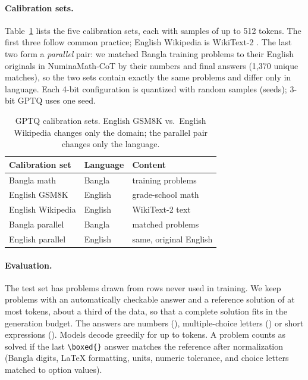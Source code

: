 \documentclass[11pt]{article}
\begin{document}
\paragraph{Calibration sets.}
Table~\ref{tab:calib} lists the five calibration sets, each with \NumCalib{} samples of up to 512 tokens. The first three follow common practice; English Wikipedia is WikiText-2 \citep{merity2017wikitext}. The last two form a \emph{parallel} pair: we matched Bangla training problems to their English originals in NuminaMath-CoT by their numbers and final answers (1,370 unique matches), so the two sets contain exactly the same problems and differ only in language. Each 4-bit configuration is quantized with \NumSeeds{} random samples (seeds); 3-bit GPTQ uses one seed.

\begin{table}[t]
\centering
\small
\begin{tabular}{lll}
\toprule
Calibration set & Language & Content \\
\midrule
Bangla math & Bangla & training problems \\
English GSM8K & English & grade-school math \\
English Wikipedia & English & WikiText-2 text \\
\midrule
Bangla parallel & Bangla & matched problems \\
English parallel & English & same, original English \\
\bottomrule
\end{tabular}
\caption{GPTQ calibration sets. English GSM8K vs.\ English Wikipedia changes only the domain; the parallel pair changes only the language.}
\label{tab:calib}
\end{table}

\paragraph{Evaluation.}
The test set has \NumEval{} problems drawn from rows never used in training. We keep problems with an automatically checkable answer and a reference solution of at most \MaxRefTokens{} tokens, about a third of the data, so that a complete solution fits in the generation budget. The answers are numbers (\CompNumeric), multiple-choice letters (\CompChoice) or short expressions (\CompExpression). Models decode greedily for up to \MaxNewTokens{} tokens. A problem counts as solved if the last \texttt{\textbackslash boxed\{\}} answer matches the reference after normalization (Bangla digits, LaTeX formatting, units, numeric tolerance, and choice letters matched to option values).
\end{document}
